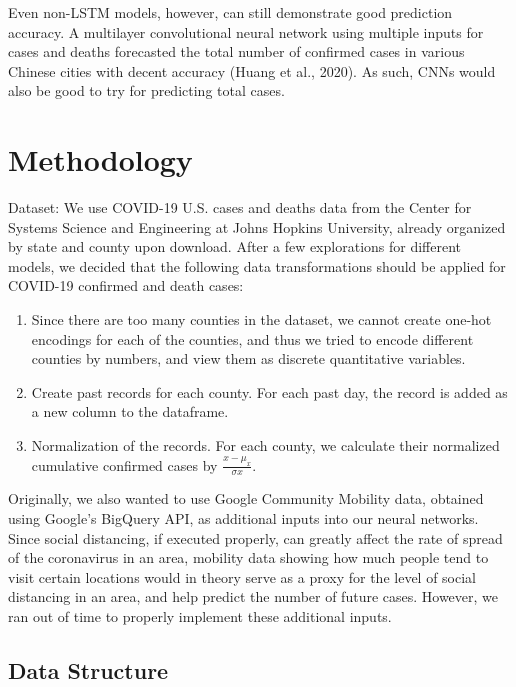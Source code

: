 ﻿\documentclass{article}
\begin{document}
Even non-LSTM models, however, can still demonstrate good prediction accuracy. A
multilayer convolutional neural network using multiple inputs for cases and
deaths forecasted the total number of confirmed cases in various Chinese cities
with decent accuracy (Huang et al., 2020). As such, CNNs would also be good to
try for predicting total cases.\\


\section*{Methodology}

Dataset: We use COVID-19 U.S. cases and deaths data from the Center for Systems
Science and Engineering at Johns Hopkins University, already organized by state
and county upon download. After a few explorations for different models, we
decided that the following data transformations should be applied for COVID-19
confirmed and death cases:

\begin{enumerate}
    \item Since there are too many counties in the dataset, we cannot create
    one-hot encodings for each of the counties, and thus we tried to encode
    different counties by numbers, and view them as discrete quantitative
    variables.

    \item Create past records for each county. For each past day, the record is
    added as a new column to the dataframe. 

    \item Normalization of the records. For each county, we calculate their
    normalized cumulative confirmed cases by $\frac{x-\mu_{x}}{\sigma{x}}$.
\end{enumerate}




Originally, we also wanted to use Google Community Mobility data, obtained using
Google’s BigQuery API, as additional inputs into our neural networks. Since
social distancing, if executed properly, can greatly affect the rate of spread
of the coronavirus in an area, mobility data showing how much people tend to
visit certain locations would in theory serve as a proxy for the level of social
distancing in an area, and help predict the number of future cases. However, we
ran out of time to properly implement these additional inputs.


\subsection*{Data Structure}
\end{document}

